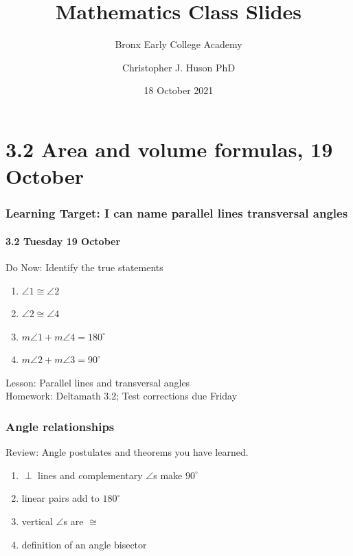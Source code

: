 \documentclass{beamer}
\title{Mathematics Class Slides}
\subtitle{Bronx Early College Academy}
\author{Christopher J. Huson PhD}
\date{18 October 2021}
\begin{document}
\frame{\titlepage}
\section[Outline]{}
\frame{\tableofcontents}

\section{3.2 Area and volume formulas, 19 October}
\frame
{
  \frametitle{Learning Target: I can name parallel lines transversal angles}
  \framesubtitle{%
  \hfill \alert{3.2 Tuesday 19 October}}
  \begin{block}{Do Now: Identify the true statements}
    \begin{multicols}{2}
    \begin{enumerate}
      \item $\angle 1 \cong \angle 2$
      \item $\angle 2 \cong \angle 4$
      \item $m\angle 1 + m\angle 4=180^\circ$
      \item $m\angle 2 + m\angle 3=90^\circ$
  \end{enumerate}
  \begin{center}
  \end{center}
\end{multicols}
\end{block}
  Lesson: Parallel lines and transversal angles \\[0.25cm]
  Homework: Deltamath 3.2; Test corrections due Friday
}

\frame
  {
    \frametitle{Angle relationships}
    Review: Angle postulates and theorems you have learned. 
    \begin{enumerate}
      \item $\perp$ lines and complementary $\angle$s make $90^\circ$
      \item linear pairs add to $180^\circ$
      \item vertical $\angle$s are $\cong$
      \item definition of an angle bisector
    \end{enumerate}
  }
\end{document}
